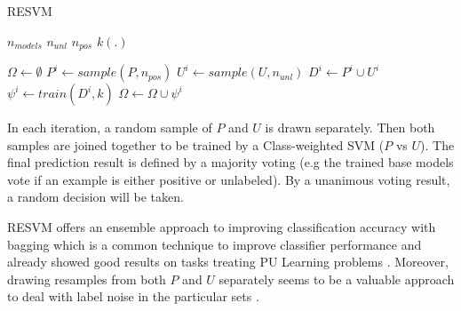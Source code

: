\begin{algorithm}[h!]                      
\caption{RESVM} 
\label{alg:RESVM}
\begin{algorithmic}[0]
        \State $ n_{models}  $ 
         \State $ n_{unl}  $ 
        \State $ n_{pos}  $  
        \State $ k(.)  $  
        
\end{algorithmic}
    \begin{algorithmic}[1]
       \State $\Omega    \gets \emptyset$  
            \State $P^i \gets sample(P,n_{pos}) $ 
            \State $U^i \gets sample(U,n_{unl}) $ 
            \State $ D^i \gets  P^i \cup U^i$ 
            \State $\psi^i \gets train(D^i,k) $ 
            \State $\Omega \gets \Omega \cup \psi^i $ 
   \end{algorithmic}
\end{algorithm}

In each iteration, a random sample of \(P\) and \(U\) is drawn separately. Then both samples are joined together to be trained by a Class-weighted SVM (\(P\) vs \(U\)). The final prediction result is defined by a majority voting (e.g the trained base models vote if an example is either positive or unlabeled). By a unanimous voting result, a random decision will be taken. 

RESVM offers an ensemble approach to improving classification accuracy with bagging which is a common technique to improve classifier performance and already showed good results on tasks treating PU Learning problems \cite{journals/prl/MordeletV14,journals/ml/Breiman00,breiman:ml96}. Moreover, drawing resamples from both \(P\) and \(U\) separately seems to be a valuable approach to deal with label noise in the particular sets \cite{Claesen:2014}.


